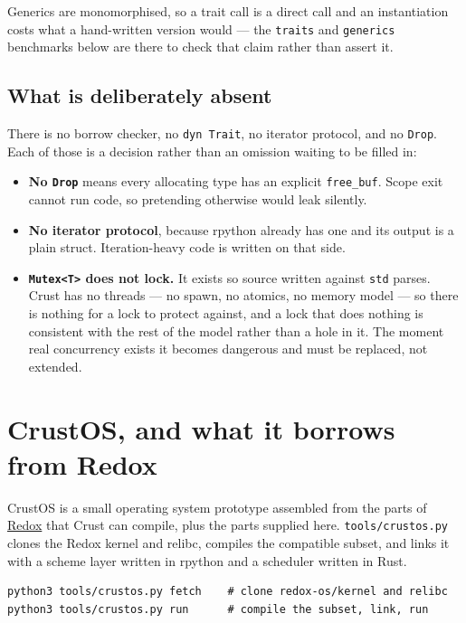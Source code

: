 Generics are monomorphised, so a trait call is a direct call and an
instantiation costs what a hand-written version would --- the
\texttt{traits} and \texttt{generics} benchmarks below are there to check that
claim rather than assert it.

\subsection{What is deliberately absent}

There is no borrow checker, no \texttt{dyn Trait}, no iterator protocol, and
no \texttt{Drop}. Each of those is a decision rather than an omission waiting
to be filled in:

\begin{itemize}
  \item \textbf{No \texttt{Drop}} means every allocating type has an explicit
    \texttt{free\_buf}. Scope exit cannot run code, so pretending otherwise
    would leak silently.
  \item \textbf{No iterator protocol}, because rpython already has one and its
    output is a plain struct. Iteration-heavy code is written on that side.
  \item \textbf{\texttt{Mutex<T>} does not lock.} It exists so source written
    against \texttt{std} parses. Crust has no threads --- no spawn, no atomics,
    no memory model --- so there is nothing for a lock to protect against, and
    a lock that does nothing is consistent with the rest of the model rather
    than a hole in it. The moment real concurrency exists it becomes dangerous
    and must be replaced, not extended.
\end{itemize}

\section{CrustOS, and what it borrows from Redox}

CrustOS is a small operating system prototype assembled from the parts of
\href{https://redox-os.org}{Redox} that Crust can compile, plus the parts
supplied here. \texttt{tools/crustos.py} clones the Redox kernel and relibc,
compiles the compatible subset, and links it with a scheme layer written in
rpython and a scheduler written in Rust.

\begin{verbatim}
python3 tools/crustos.py fetch    # clone redox-os/kernel and relibc
python3 tools/crustos.py run      # compile the subset, link, run
\end{verbatim}

